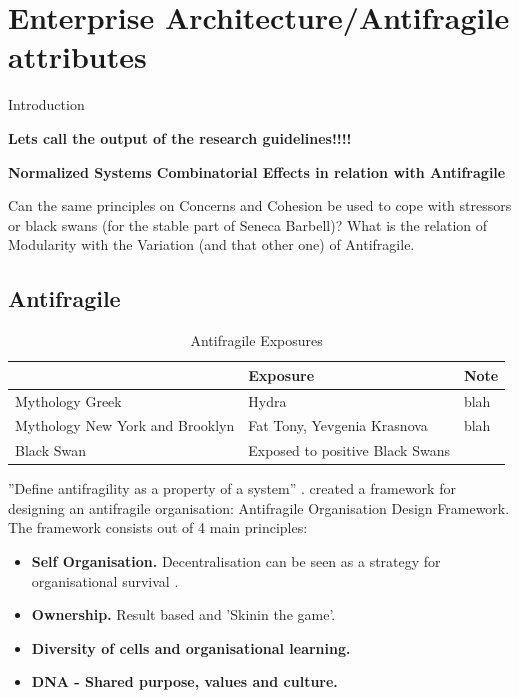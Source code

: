 \chapter{Enterprise Architecture/Antifragile attributes}
\label{ch:eaafattributes}

Introduction

\begin{remark}
\textbf{Lets call the output of the research guidelines!!!!}
\end{remark}

\begin{remark}
\textbf{Normalized Systems Combinatorial Effects in relation with Antifragile}

Can the same principles on Concerns and Cohesion be used to cope with stressors or black swans (for the stable part of Seneca Barbell)? What is the relation of Modularity with the Variation (and that other one) of Antifragile.
\end{remark}



\section{Antifragile}
\label{sec:sfantifragile}

\parencite[p. 23-27]{Taleb2012}
\begin{longtable}{p{}p{}p{}}
	& \textbf{Exposure} & \textbf{Note} \\ \midrule%
	\endhead%
	\hline
	\caption{Antifragile Exposures}
	\label{tab:sfantifragile types of exposure}	
	\endfoot%
	Mythology Greek & Hydra & blah \\
	Mythology New York and Brooklyn & Fat Tony, Yevgenia Krasnova & blah \\
	Black Swan & Exposed to positive Black Swans & \\
	
	\bottomrule
\end{longtable}

''Define antifragility as a property of a system'' \parencite{Jaaron2014}. \textcite{Kastner2017} created a framework for designing an antifragile organisation: Antifragile Organisation Design Framework. The framework consists out of 4 main principles:
\begin{itemize}
	\item{\textbf{Self Organisation.} Decentralisation can be seen as a strategy for organisational survival \parencite{Brafman2007}.}
	\item{\textbf{Ownership.} Result based and 'Skinin the game'.}
	\item{\textbf{Diversity of cells and organisational learning.}}
	\item{\textbf{DNA - Shared purpose, values and culture.}}
\end{itemize}

